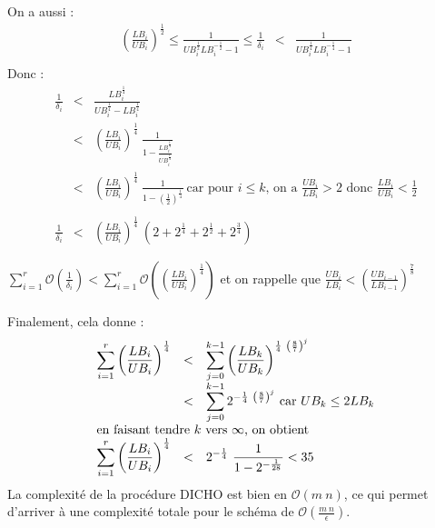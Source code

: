 \documentclass[10pt,francais]{llncs}
\begin{document}
{On a aussi :
$$
\begin{array}{rcl}
	\displaystyle \left(\frac{LB_i}{UB_i}\right)^\frac{1}{2} \leq \frac{1}{UB_i^\frac{1}{2}LB_i^{-\frac{1}{2}}-1} \leq \frac{1}{\delta_i}
		& < & 
		\displaystyle\frac{1}{UB_i^\frac{1}{4}LB_i^{-\frac{1}{4}}-1}\\
\end{array}
$$
Donc :
$$
\begin{array}{rcl}
	\displaystyle \frac{1}{\delta_i} & < &
		\displaystyle\frac{LB_i^\frac{1}{4}}{UB_i^\frac{1}{4}-LB_i^\frac{1}{4}}\\
	& < &	\displaystyle\left(\frac{LB_i}{UB_i}\right)^\frac{1}{4}\ \frac{1}{\displaystyle1-\frac{LB_i^\frac{1}{4}}{UB_i^\frac{1}{4}}}\\
	& < & 
		\displaystyle\left(\frac{LB_i}{UB_i}\right)^\frac{1}{4}\ \frac{1}{1 - \left(\frac{1}{2}\right)^\frac{1}{4}}\ \textrm{car pour }i \leq k\textrm{, on a }\displaystyle \frac{UB_i}{LB_i} > 2 \textrm{ donc }\frac{LB_i}{UB_i} < \frac{1}{2}\\
\\
	\displaystyle \frac{1}{\delta_i}
		& < &
		\displaystyle\left(\frac{LB_i}{UB_i}\right)^\frac{1}{4}\ \left(2 + 2^\frac{1}{4} + 2^\frac{1}{2} + 2^\frac{3}{4}\right)  
\end{array}
$$

$\displaystyle \sum_{i=1}^r \mathcal{O}\left(\frac{1}{\delta_i}\right) < \sum_{i=1}^r \mathcal{O}\left(\left(\frac{LB_i}{UB_i}\right)^\frac{1}{4}\right)$ et on rappelle que $\displaystyle \frac{{UB}_i}{{LB}_i} < \left(\frac{UB_{i-1}}{LB_{i-1}}\right)^\frac{7}{8}$

Finalement, cela donne :
$$
\begin{array}{rcl}
	\displaystyle \sum_{i=1}^r \left(\frac{LB_i}{UB_i}\right)^\frac{1}{4} 
		& < & 
		\displaystyle \sum_{j=0}^{k-1} \left(\frac{LB_k}{UB_k}\right)^{\frac{1}{4}\ \left(\frac{8}{7}\right)^j}\\
	& < &
		\displaystyle \sum_{j=0}^{k-1} 2^{-\frac{1}{4}\ \left(\frac{8}{7}\right)^j}\ \textrm{car }UB_k \leq 2 LB_k\\
	\multicolumn{3}{l}{\textrm{en faisant tendre }k\textrm{ vers }\infty\textrm{, on obtient }}\\
	\displaystyle \sum_{i=1}^r \left(\frac{LB_i}{UB_i}\right)^\frac{1}{4} 
		& < & 
		\displaystyle2^{-\frac{1}{4}}\ \frac{1}{1-2^{-\frac{1}{28}}} < 35\\
	 
\end{array}
$$
La complexit\'e de la proc\'edure DICHO est bien en $\mathcal{O}(m\ n)$, ce qui permet d'arriver \`a une complexit\'e totale pour le sch\'ema de $\displaystyle \mathcal{O}\left(\frac{m\ n}{\epsilon}\right)$.


}
\end{document}
